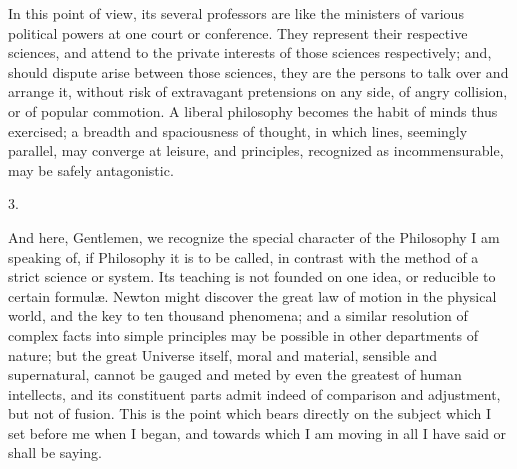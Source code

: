 In this point of view, its several professors are like the
ministers of various political powers at one court or conference. They
represent their respective sciences, and attend to the private
interests of those sciences respectively; and, should dispute arise
between those sciences, they are the persons to talk over and arrange
it, without risk of extravagant pretensions on any side, of angry
collision, or of popular commotion. A liberal philosophy becomes the
habit of minds thus exercised; a breadth and spaciousness of thought,
in which lines, seemingly parallel, may converge at leisure, and
principles, recognized as incommensurable, may be safely antagonistic.

3.

And here, Gentlemen, we recognize the special character of the
Philosophy I am speaking of, if Philosophy it is to be called, in
contrast with the method of a strict science or system. Its teaching
is not founded on one idea, or reducible to certain formulæ. Newton
might discover the great law of motion in the physical world, and the
key to ten thousand phenomena; and a similar resolution of complex
facts into simple principles may be possible in other departments of
nature; but the great Universe itself, moral and material, sensible
and supernatural, cannot be gauged and meted by even the greatest of
human intellects, and its constituent parts admit indeed of comparison
and adjustment, but not of fusion. This is the point which bears
directly on the subject which I set before me when I began, and
towards which I am moving in all I have said or shall be saying.

